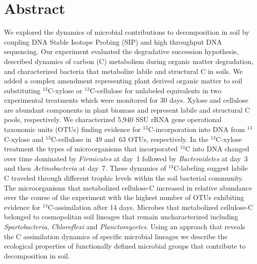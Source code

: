 \section{Abstract} We explored the dynamics of microbial contributions to
decomposition in soil by coupling DNA Stable Isotope Probing (SIP) and high
throughput DNA sequencing. Our experiment evaluated the degradative succession
hypothesis, described dynamics of carbon (C) metabolism during organic matter
degradation, and characterized bacteria that metabolize labile and structural
C in soils. We added a complex amendment representing plant derived organic
matter to soil substituting $^{13}$C-xylose or $^{13}$C-cellulose for unlabeled
equivalents in two experimental treatments which were monitored for 30 days.
Xylose and cellulose are abundant components in plant biomass and represent
labile and structural C pools, respectively. We characterized 5,940 SSU rRNA
gene operational taxonomic units (OTUs) finding evidence for
$^{13}$C-incorporation into DNA from $^{13}$C-xylose and $^{13}$C-cellulose
in~49 and~63 OTUs, respectively. In the $^{13}$C-xylose treatment the types of
microorganisms that incorporated $^{13}$C into DNA changed over time dominated
by \textit{Firmicutes} at day~1 followed by \textit{Bacteroidetes} at day~3 and
then \textit{Actinobacteria} at day~7. These dynamics of $^{13}$C-labeling
suggest labile C traveled through different trophic levels within the soil
bacterial community. The microorganisms that metabolized cellulose-C increased
in relative abundance over the course of the experiment with the highest number
of OTUs exhibiting evidence for $^{13}$C-assimilation after 14 days. Microbes
that metabolized cellulose-C belonged to cosmopolitan soil lineages that remain
uncharacterized including \textit{Spartobacteria}, \textit{Chloroflexi} and
\textit{Planctomycetes}. Using an approach that reveals the C assimilation
dynamics of specific microbial lineages we describe the ecological properties
of functionally defined microbial groups that contribute to decomposition in
soil.
